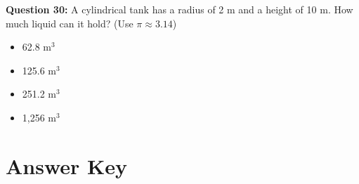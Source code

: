 \documentclass[12pt, letterpaper]{article}
\begin{document}
\noindent
\textbf{Question 30:} A cylindrical tank has a radius of 2 m and a height of 10 m. How much liquid can it hold? (Use $\pi \approx 3.14$)
\begin{itemize}
    \item[(A)] 62.8 m$^3$
    \item[(B)] 125.6 m$^3$
    \item[(C)] 251.2 m$^3$
    \item[(D)] 1,256 m$^3$
\end{itemize}

\vspace{1cm}

\section*{Answer Key}
\end{document}
